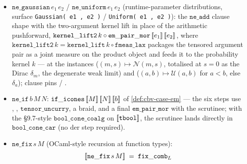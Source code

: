 \begin{itemize}
    $\mathtt{meas\_lift}\,f \circ \sem{e}$, with
     the $\FMeas$ functorial
    action (pushforward) at the carrier transport of the measurable
    $f : \mathbb{R} \to \mathbb{R}$ --- no $[0,1]$ bounds are needed,
    since the pushforward already has operator norm at most one. The
    Dirac identity 
    ($\delta_r \mapsto \delta_{f(r)}$) and the total-mass identity
     are the load-bearing
    laws; the clause pin is
     --- the
    $\FMeas$-functorial mirror of the $\mathtt{ne\_score}$ clause.
  \item $\mathtt{ne\_gaussian}\,e_1\,e_2$ /
    $\mathtt{ne\_uniform}\,e_1\,e_2$ (runtime-parameter
    distributions, surface \texttt{Gaussian( e1 , e2 )} /
    \texttt{Uniform( e1 , e2 )}): the $\mathtt{ne\_add}$ clause shape
    with the two-argument kernel lift in place of the arithmetic
    pushforward,
    $\mathtt{kernel\_lift2}\,k \circ
     \mathtt{em\_pair\_mor}\,[\![ e_1 ]\!]\,[\![ e_2 ]\!]$, where
    $\mathtt{kernel\_lift2}\,k = \mathtt{kernel\_lift}\,k \circ
     \mathtt{fmeas\_lax}$ packages the tensored argument pair as a
    joint measure on the product object and feeds it to the
    probability kernel $k$ ---
     at the
    instances 
    ($(m,s) \mapsto \mathcal{N}(m,s)$, totalised at $s = 0$ as the
    Dirac $\delta_m$, the degenerate weak limit) and
    ($(a,b) \mapsto \mathcal{U}(a,b)$ for $a < b$, else
    $\delta_a$); clause pins
     /
    .
  \item $\mathtt{ne\_if}\,b\,M\,N$:
    $\mathtt{if\_icones}\,[\![ M ]\!]\,[\![ N ]\!]\,[\![ b ]\!]$ of
    \autoref{def:cbv-case-em} --- the six steps use
    ,
    ,
    $\mathtt{tensor\_uncurry}$, a braid, and a final
    $\mathtt{em\_pair\_mor}$ with the scrutinee; with the §9.7-style
    $\mathtt{bool\_cone\_coalg}$ on $[\![ \mathtt{tbool} ]\!]$, the
    scrutinee lands directly in $\mathtt{bool\_cone\_car}$ (no
    $\mathrm{der}$ step required).
  \item $\mathtt{ne\_fix}\,s\,M$ (OCaml-style recursion at function
    types):
    \[
      [\![ \mathtt{ne\_fix}\,s\,M ]\!]
      \;=\;
      \mathtt{fix\_comb}_{L}
\]
\end{itemize}
